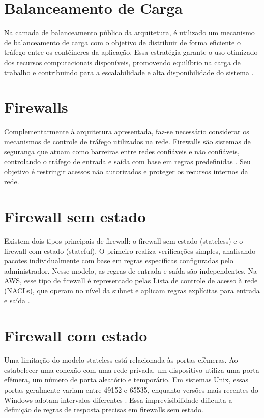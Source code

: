 \section{Balanceamento de Carga}Na camada de balanceamento público da arquitetura, é utilizado um mecanismo de balanceamento de carga com o objetivo de distribuir de forma eficiente o tráfego entre os contêineres da aplicação. Essa estratégia garante o uso otimizado dos recursos computacionais disponíveis, promovendo equilíbrio na carga de trabalho e contribuindo para a escalabilidade e alta disponibilidade do sistema \cite{cloudflare2024balancer}.

\section{Firewalls}Complementarmente à arquitetura apresentada, faz-se necessário considerar os mecanismos de controle de tráfego utilizados na rede. Firewalls são sistemas de segurança que atuam como barreiras entre redes confiáveis e não confiáveis, controlando o tráfego de entrada e saída com base em regras predefinidas \cite{kaspersky2024firewall}. Seu objetivo é restringir acessos não autorizados e proteger os recursos internos da rede.

\section{Firewall sem estado}Existem dois tipos principais de firewall: o firewall sem estado (stateless) e o firewall com estado (stateful). O primeiro realiza verificações simples, analisando pacotes individualmente com base em regras específicas configuradas pelo administrador. Nesse modelo, as regras de entrada e saída são independentes. Na AWS, esse tipo de firewall é representado pelas  Lista de controle de acesso à rede (NACLs), que operam no nível da subnet e aplicam regras explícitas para entrada e saída \cite{fortinet2024firewall}.

\section{Firewall com estado}Uma limitação do modelo stateless está relacionada às portas efêmeras. Ao estabelecer uma conexão com uma rede privada, um dispositivo utiliza uma porta efêmera, um número de porta aleatório e temporário. Em sistemas Unix, essas portas geralmente variam entre 49152 e 65535, enquanto versões mais recentes do Windows adotam intervalos diferentes \cite{stackexchange2024ephemeralports}. Essa imprevisibilidade dificulta a definição de regras de resposta precisas em firewalls sem estado.

